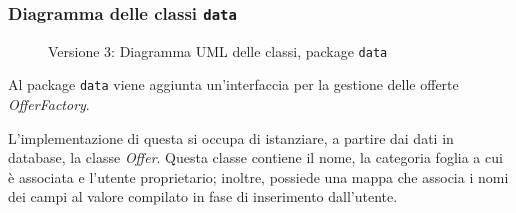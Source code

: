 \subsubsection{Diagramma delle classi \texttt{data}}
\vspace{0.5cm}
\begin{figure}[H]
    \centering
    \caption{Versione 3: Diagramma UML delle classi, package \texttt{data}}
    \label{fig:class_data_v_3}
\end{figure}

Al package \texttt{data} viene aggiunta un'interfaccia per la gestione delle offerte \textit{OfferFactory}.

L'implementazione di questa si occupa di istanziare, a partire dai dati in database, la classe \textit{Offer}.
Questa classe contiene il nome, la categoria foglia a cui è associata e l'utente proprietario; inoltre, possiede una mappa che associa i nomi dei campi al valore compilato in fase di inserimento dall'utente.